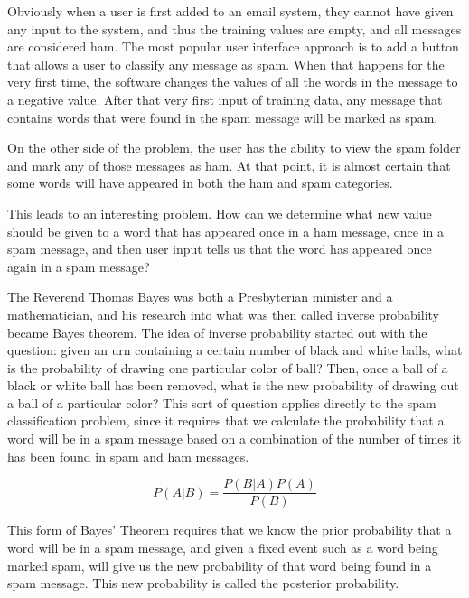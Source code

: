 \documentclass[12pt]{article}
\begin{document}
Obviously when a user is first added to an email system, they cannot have given any input to the system, and
thus the training values are empty, and all messages are considered ham. The most popular user interface
approach is to add a button that allows a user to classify any message as spam. When that happens for the very
first time, the software changes the values of all the words in the message to a negative value. After that
very first input of training data, any message that contains words that were found in the spam message will be
marked as spam. 

On the other side of the problem, the user has the ability to view the spam folder and mark any of those
messages as ham. At that point, it is almost certain that some words will have appeared in both the ham and
spam categories. 

This leads to an interesting problem. How can we determine what new value should be given to a word that has
appeared once in a ham message, once in a spam message, and then user input tells us that the word has
appeared once again in a spam message?

The Reverend Thomas Bayes was both a Presbyterian minister and a mathematician, and his research into what was
then called inverse probability became Bayes theorem. The idea of inverse probability started out with the
question: given an urn containing a certain number of black and white balls, what is the probability of
drawing one particular color of ball? Then, once a ball of a black or white ball has been removed, what is the
new probability of drawing out a ball of a particular color? This sort of question applies directly to the
spam classification problem, since it requires that we calculate the probability that a word will be in a spam
message based on a combination of the number of times it has been found in spam and ham messages.

$$P(A|B)= \dfrac{P(B|A)P(A)}{P(B)}$$

This form of Bayes' Theorem requires that we know the prior probability that a word will be in a spam
message, and given a fixed event such as a word being marked spam, will give us the new probability of that
word being found in a spam message. This new probability is called the posterior probability. 
\end{document}
